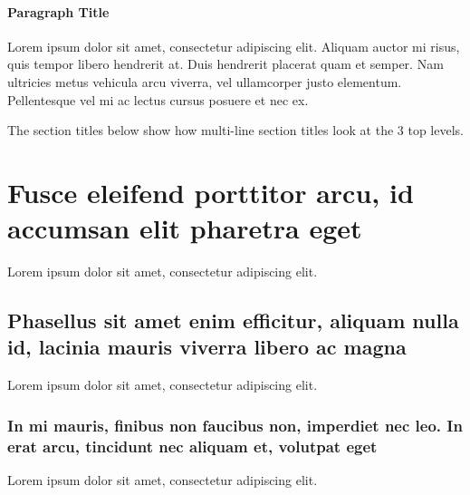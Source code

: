 \documentclass[
	a4paper, %
	12pt, %
]{CSSullivanBusinessReport}
\begin{document}
\paragraph{Paragraph Title} %

Lorem ipsum dolor sit amet, consectetur adipiscing elit. Aliquam auctor mi risus, quis tempor libero hendrerit at. Duis hendrerit placerat quam et semper. Nam ultricies metus vehicula arcu viverra, vel ullamcorper justo elementum. Pellentesque vel mi ac lectus cursus posuere et nec ex.

The section titles below show how multi-line section titles look at the 3 top levels.

\section[Short version of long section title]{Fusce eleifend porttitor arcu, id accumsan elit pharetra eget} %

Lorem ipsum dolor sit amet, consectetur adipiscing elit. 

\subsection[Short version of long subsection title]{Phasellus sit amet enim efficitur, aliquam nulla id, lacinia mauris viverra libero ac magna}

Lorem ipsum dolor sit amet, consectetur adipiscing elit.

\subsubsection{In mi mauris, finibus non faucibus non, imperdiet nec leo. In erat arcu, tincidunt nec aliquam et, volutpat eget}

Lorem ipsum dolor sit amet, consectetur adipiscing elit.

\end{document}
